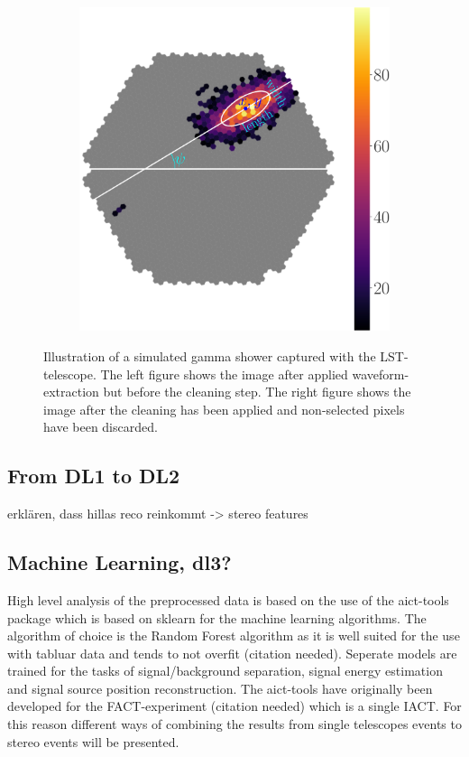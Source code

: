 \begin{figure}
\begin{subfigure}{0.3\textwidth}
        \label{fig:shower_image_cleaned}
    \end{subfigure}
    \begin{subfigure}{0.3\textwidth}
        \includegraphics[width=0.9\linewidth]{Plots/hillas_cleaned_params.pdf} 
        \label{fig:hillas_parameters_only}
    \end{subfigure}
    \caption{Illustration of a simulated gamma shower captured with the LST-telescope.
        The left figure shows the image after applied waveform-extraction but before
        the cleaning step. The right figure shows the image after the cleaning has been applied
        and non-selected pixels have been discarded.}
    \label{fig:shower_image}
\end{figure}

\subsection{From DL1 to DL2}  %
erklären, dass hillas reco reinkommt -> stereo features

\subsection{Machine Learning, dl3?}
High level analysis of the preprocessed data is based on the use of
the aict-tools \cite{aict-tools} package which is based on
sklearn \cite{sklearn_api} for the machine learning algorithms.
The algorithm of choice is the Random Forest algorithm
as it is well suited for the use with tabluar data and tends to not overfit
(citation needed).
Seperate models are trained for the tasks of signal/background
separation, signal energy estimation and signal source position
reconstruction.
The aict-tools have originally been developed for the FACT-experiment
(citation needed) which is a single IACT. For this reason
different ways of combining the results from single telescopes events
to stereo events will be presented.


